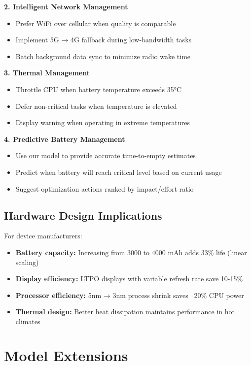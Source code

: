 \documentclass[12pt]{article}
\begin{document}
\textbf{2. Intelligent Network Management}
\begin{itemize}
\item Prefer WiFi over cellular when quality is comparable
\item Implement 5G → 4G fallback during low-bandwidth tasks
\item Batch background data sync to minimize radio wake time
\end{itemize}

\textbf{3. Thermal Management}
\begin{itemize}
\item Throttle CPU when battery temperature exceeds 35°C
\item Defer non-critical tasks when temperature is elevated
\item Display warning when operating in extreme temperatures
\end{itemize}

\textbf{4. Predictive Battery Management}
\begin{itemize}
\item Use our model to provide accurate time-to-empty estimates
\item Predict when battery will reach critical level based on current usage
\item Suggest optimization actions ranked by impact/effort ratio
\end{itemize}

\subsection{Hardware Design Implications}

For device manufacturers:
\begin{itemize}
\item \textbf{Battery capacity:} Increasing from 3000 to 4000 mAh adds 33\% life (linear scaling)
\item \textbf{Display efficiency:} LTPO displays with variable refresh rate save 10-15\%
\item \textbf{Processor efficiency:} 5nm → 3nm process shrink saves ~20\% CPU power
\item \textbf{Thermal design:} Better heat dissipation maintains performance in hot climates
\end{itemize}

\section{Model Extensions}
\end{document}

